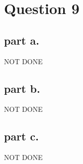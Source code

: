 \section{Question 9}

\subsection{part a.}
NOT DONE

\subsection{part b.}
NOT DONE

\subsection{part c.}
NOT DONE
